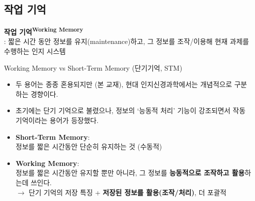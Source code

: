 \documentclass{beamer}
\begin{document}
\subsection{작업 기억}
\begin{frame}{\textbf{작업 기억\textsuperscript{Working Memory}}\\\large : 짧은 시간 동안 정보를 유지(maintenance)하고, 그 정보를 조작/이용해 현재 과제를 수행하는 인지 시스템
}
  \begin{block}{Working Memory vs Short-Term Memory (단기기억, STM)}
    \begin{itemize}
      \item 두 용어는 종종 혼용되지만 (본 교재), 현대 인지신경과학에서는 개념적으로 구분하는 경향이다.
      \item 초기에는 단기 기억으로 불렸으나, 정보의 `능동적 처리' 기능이 강조되면서 작동 기억이라는 용어가 등장했다.
      \item \textbf{Short-Term Memory}: \\정보를 짧은 시간동안 단순히 유지하는 것 (수동적)
      \item \textbf{Working Memory}: \\정보를 짧은 시간동안 유지할 뿐만 아니라, 그 정보를 \textbf{능동적으로 조작하고 활용}하는데 쓰인다.\\
        $\rightarrow$ 단기 기억의 저장 특징 + \textbf{저장된 정보를 활용(조작/처리)}, 더 포괄적
    \end{itemize}
  \end{block}
\end{frame}
\end{document}
